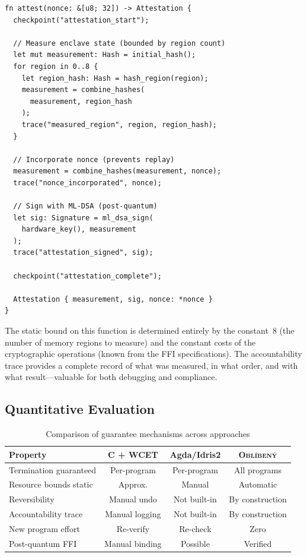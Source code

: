 \documentclass[11pt,a4paper]{article}
\newcommand{\obl}{\textsc{Obl\'{i}ben\'{y}}}
\begin{document}
\begin{lstlisting}[language=oblibeny,caption={Enclave attestation in constrained form}]
fn attest(nonce: &[u8; 32]) -> Attestation {
  checkpoint("attestation_start");

  // Measure enclave state (bounded by region count)
  let mut measurement: Hash = initial_hash();
  for region in 0..8 {
    let region_hash: Hash = hash_region(region);
    measurement = combine_hashes(
      measurement, region_hash
    );
    trace("measured_region", region, region_hash);
  }

  // Incorporate nonce (prevents replay)
  measurement = combine_hashes(measurement, nonce);
  trace("nonce_incorporated", nonce);

  // Sign with ML-DSA (post-quantum)
  let sig: Signature = ml_dsa_sign(
    hardware_key(), measurement
  );
  trace("attestation_signed", sig);

  checkpoint("attestation_complete");

  Attestation { measurement, sig, nonce: *nonce }
}
\end{lstlisting}

The static bound on this function is determined entirely by the constant~8
(the number of memory regions to measure) and the constant costs of the
cryptographic operations (known from the FFI specifications).  The
accountability trace provides a complete record of what was measured, in what
order, and with what result---valuable for both debugging and compliance.

\subsection{Quantitative Evaluation}

\begin{table}[htbp]
\centering
\caption{Comparison of guarantee mechanisms across approaches}
\label{tab:comparison}
\begin{tabular}{@{}lccc@{}}
\toprule
\textbf{Property} & \textbf{C + WCET} & \textbf{Agda/Idris2} & \textbf{\obl{}} \\
\midrule
Termination guaranteed & Per-program & Per-program & All programs \\
Resource bounds static & Approx. & Manual & Automatic \\
Reversibility & Manual undo & Not built-in & By construction \\
Accountability trace & Manual logging & Not built-in & By construction \\
New program effort & Re-verify & Re-check & Zero \\
Post-quantum FFI & Manual binding & Possible & Verified \\
\bottomrule
\end{tabular}
\end{table}
\end{document}
